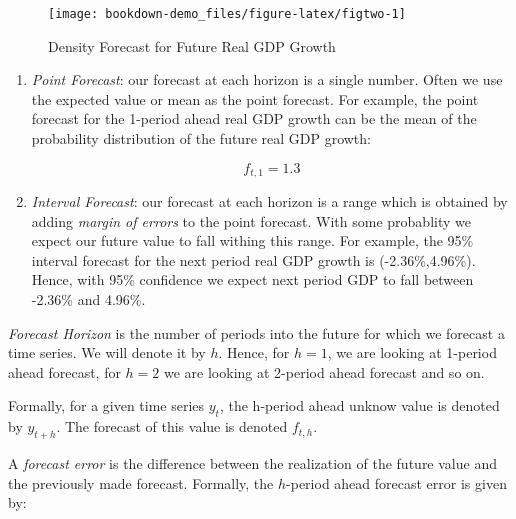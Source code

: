\documentclass[]{book}
\providecommand{\tightlist}{%
  \setlength{\itemsep}{0pt}\setlength{\parskip}{0pt}}
\theoremstyle{definition}
\theoremstyle{definition}
\theoremstyle{definition}
\theoremstyle{remark}
\let\BeginKnitrBlock\begin \let\EndKnitrBlock\end
\begin{document}
\begin{figure}

{\centering \texttt{[image: bookdown-demo\_files/figure-latex/figtwo-1]} 

}

\caption{Density Forecast for Future Real GDP Growth}\label{fig:figtwo}
\end{figure}

\begin{enumerate}
\def\labelenumi{\arabic{enumi}.}
\setcounter{enumi}{1}
\tightlist
\item
  \emph{Point Forecast}: our forecast at each horizon is a single
  number. Often we use the expected value or mean as the point forecast.
  For example, the point forecast for the 1-period ahead real GDP growth
  can be the mean of the probability distribution of the future real GDP
  growth:

  \begin{equation}
  f_{t,1}=1.3%
  \end{equation}
\item
  \emph{Interval Forecast}: our forecast at each horizon is a range
  which is obtained by adding \emph{margin of errors} to the point
  forecast. With some probablity we expect our future value to fall
  withing this range. For example, the 95\% interval forecast for the
  next period real GDP growth is (-2.36\%,4.96\%). Hence, with 95\%
  confidence we expect next period GDP to fall between -2.36\% and
  4.96\%.
\end{enumerate}

\BeginKnitrBlock{definition}[Forecast Horizon]
\protect\hypertarget{def:d2}{}{\label{def:d2} \iffalse (Forecast Horizon)
\fi{} }
\EndKnitrBlock{definition} \emph{Forecast Horizon} is the number of
periods into the future for which we forecast a time series. We will
denote it by \(h\). Hence, for \(h=1\), we are looking at 1-period ahead
forecast, for \(h=2\) we are looking at 2-period ahead forecast and so
on.

Formally, for a given time series \(y_t\), the h-period ahead unknow
value is denoted by \(y_{t+h}\). The forecast of this value is denoted
\(f_{t,h}\).

\BeginKnitrBlock{definition}[Forecast Error]
\protect\hypertarget{def:d3}{}{\label{def:d3} \iffalse (Forecast Error)
\fi{} }
\EndKnitrBlock{definition}

A \emph{forecast error} is the difference between the realization of the
future value and the previously made forecast. Formally, the
\(h\)-period ahead forecast error is given by:
\end{document}
